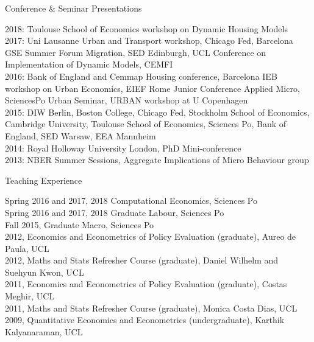 \documentclass{cvjobmarket} %
\begin{document}

\begin{rSection}{Conference \& Seminar Presentations}

{2018: Toulouse School of Economics workshop on Dynamic Housing Models}\\
{2017: Uni Lausanne Urban and Transport workshop, Chicago Fed, Barcelona GSE Summer Forum Migration, SED Edinburgh, UCL Conference on Implementation of Dynamic Models, CEMFI}\\
{2016: Bank of England and Cemmap Housing conference, Barcelona IEB workshop on Urban Economics, EIEF Rome Junior Conference Applied Micro, SciencesPo Urban Seminar, URBAN workshop at U Copenhagen}\\
{2015: DIW Berlin, Boston College, Chicago Fed, Stockholm School of Economics, Cambridge University, Toulouse School of Economics, Sciences Po, Bank of England, SED Warsaw, EEA Mannheim}\\
{2014: Royal Holloway University London, PhD Mini-conference}\\
{2013: NBER Summer Sessions, Aggregate Implications of Micro Behaviour group}\\

\end{rSection}

\begin{rSection}{Teaching Experience}

{Spring 2016 and 2017, 2018 Computational Economics, Sciences Po}\\
{Spring 2016 and 2017, 2018 Graduate Labour, Sciences Po}\\
{Fall 2015, Graduate Macro, Sciences Po}\\
{2012, Economics and Econometrics of Policy Evaluation (graduate), Aureo de Paula, UCL}\\
{2012, Maths and Stats Refresher Course (graduate), Daniel Wilhelm and Suehyun Kwon, UCL}\\
{2011, Economics and Econometrics of Policy Evaluation (graduate), Costas Meghir, UCL}\\
{2011, Maths and Stats Refresher Course (graduate), Monica Costa Dias, UCL }\\
{2009, Quantitative Economics and Econometrics (undergraduate), Karthik Kalyanaraman, UCL}\\

\end{rSection}
\end{document}
